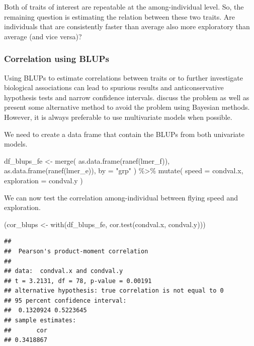 \documentclass[
  12pt,
]{book}
\newenvironment{Shaded}{\begin{snugshade}}{\end{snugshade}}
\newcommand{\AttributeTok}[1]{\textcolor[rgb]{0.77,0.63,0.00}{#1}}
\newcommand{\FunctionTok}[1]{\textcolor[rgb]{0.00,0.00,0.00}{#1}}
\newcommand{\NormalTok}[1]{#1}
\newcommand{\OtherTok}[1]{\textcolor[rgb]{0.56,0.35,0.01}{#1}}
\newcommand{\SpecialCharTok}[1]{\textcolor[rgb]{0.00,0.00,0.00}{#1}}
\newcommand{\StringTok}[1]{\textcolor[rgb]{0.31,0.60,0.02}{#1}}
\begin{document}
Both of traits of interest are repeatable at the among-individual level. So, the remaining question is estimating the relation between these two traits. Are individuals that are consistently faster than average also more exploratory than average (and vice versa)?

\hypertarget{correlation-using-blups}{%
\subsubsection{Correlation using BLUPs}\label{correlation-using-blups}}

Using BLUPs to estimate correlations between traits or to further investigate biological associations can lead to spurious results and anticonservative hypothesis tests and narrow confidence intervals. \citet{hadfield_misuse_2010} discuss the problem as well as present some alternative method to avoid the problem using Bayesian methods. However, it is always preferable to use multivariate models when possible.

We need to create a data frame that contain the BLUPs from both univariate models.

\begin{Shaded}
\begin{Highlighting}[]
\NormalTok{df\_blups\_fe }\OtherTok{\textless{}{-}} \FunctionTok{merge}\NormalTok{(}
  \FunctionTok{as.data.frame}\NormalTok{(}\FunctionTok{ranef}\NormalTok{(lmer\_f)),}
  \FunctionTok{as.data.frame}\NormalTok{(}\FunctionTok{ranef}\NormalTok{(lmer\_e)),}
  \AttributeTok{by =} \StringTok{"grp"}
\NormalTok{) }\SpecialCharTok{\%\textgreater{}\%}
  \FunctionTok{mutate}\NormalTok{(}
    \AttributeTok{speed =}\NormalTok{ condval.x,}
    \AttributeTok{exploration =}\NormalTok{ condval.y}
\NormalTok{  )}
\end{Highlighting}
\end{Shaded}

We can now test the correlation among-individual between flying speed and exploration.

\begin{Shaded}
\begin{Highlighting}[]
\NormalTok{(cor\_blups }\OtherTok{\textless{}{-}} \FunctionTok{with}\NormalTok{(df\_blups\_fe, }\FunctionTok{cor.test}\NormalTok{(condval.x, condval.y)))}
\end{Highlighting}
\end{Shaded}

\begin{verbatim}
## 
##  Pearson's product-moment correlation
## 
## data:  condval.x and condval.y
## t = 3.2131, df = 78, p-value = 0.00191
## alternative hypothesis: true correlation is not equal to 0
## 95 percent confidence interval:
##  0.1320924 0.5223645
## sample estimates:
##       cor 
## 0.3418867
\end{verbatim}
\end{document}
